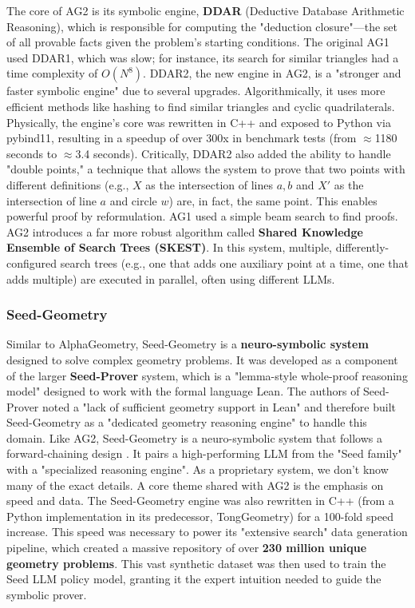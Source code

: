 \documentclass[12pt, letterpaper]{article}
\begin{document}
The core of AG2 is its symbolic engine, \textbf{DDAR} (Deductive Database Arithmetic Reasoning), which is responsible for computing the "deduction closure"---the set of all provable facts given the problem's starting conditions. The original AG1 used DDAR1, which was slow; for instance, its search for similar triangles had a time complexity of $O(N^8)$. DDAR2, the new engine in AG2, is a "stronger and faster symbolic engine" due to several upgrades. Algorithmically, it uses more efficient methods like hashing to find similar triangles and cyclic quadrilaterals. Physically, the engine's core was rewritten in C++ and exposed to Python via pybind11, resulting in a speedup of over 300x in benchmark tests (from $\approx$1180 seconds to $\approx$3.4 seconds). Critically, DDAR2 also added the ability to handle "double points," a technique that allows the system to prove that two points with different definitions (e.g., $X$ as the intersection of lines $a, b$ and $X'$ as the intersection of line $a$ and circle $w$) are, in fact, the same point. This enables powerful proof by reformulation.
    AG1 used a simple beam search to find proofs. AG2 introduces a far more robust algorithm called \textbf{Shared Knowledge Ensemble of Search Trees (SKEST)}. In this system, multiple, differently-configured search trees (e.g., one that adds one auxiliary point at a time, one that adds multiple) are executed in parallel, often using different LLMs. \citep{chervonyi2025goldmedalistperformancesolvingolympiad}
\subsubsection{Seed-Geometry}
\label{sec:seedgeo}
Similar to AlphaGeometry, Seed-Geometry \citep{chen2025seedproverdeepbroadreasoning} is a \textbf{neuro-symbolic system} designed to solve complex geometry problems. It was developed as a component of the larger \textbf{Seed-Prover} system, which is a "lemma-style whole-proof reasoning model" designed to work with the formal language Lean. The authors of Seed-Prover noted a "lack of sufficient geometry support in Lean" and therefore built Seed-Geometry as a "dedicated geometry reasoning engine" to handle this domain. Like AG2, Seed-Geometry is a neuro-symbolic system that follows a forward-chaining design . It pairs a high-performing LLM from the "Seed family" with a "specialized reasoning engine". As a proprietary system, we don't know many of the exact details.
A core theme shared with AG2 is the emphasis on speed and data. The Seed-Geometry engine was also rewritten in C++ (from a Python implementation in its predecessor, TongGeometry) for a 100-fold speed increase. This speed was necessary to power its "extensive search" data generation pipeline, which created a massive repository of over \textbf{230 million unique geometry problems}. This vast synthetic dataset was then used to train the Seed LLM policy model, granting it the expert intuition needed to guide the symbolic prover.
\end{document}
